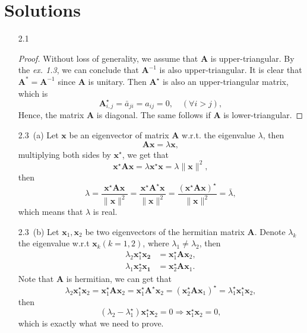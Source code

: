 \section{Solutions}
\begin{enumerate}
    \item [2.1] {
    \begin{proof}
        Without loss of generality, we assume that $\bm{A}$ is upper-triangular. By the \textit{ex. 1.3}, we can conclude that $\bm{A}^{-1}$ is also upper-triangular. It is clear that $\bm{A}^{*} = \bm{A}^{-1}$ since $\bm{A}$ is unitary. Then $\bm{A}^{\star}$ is also an upper-triangular matrix, which is
        $$
        \bm{A}^{\star}_{i,j} = \bar{a}_{ji} = a_{ij} = 0, \quad (\forall i > j),
        $$
        Hence, the matrix $\bm{A}$ is diagonal. The same follows if $\bm{A}$ is lower-triangular.
    \end{proof}
    }

	
    \item[2.3~(a)] {
    Let $\bm{x}$ be an eigenvector of matrix $\bm{A}$ w.r.t. the eigenvalue $\lambda$, then
    \[\bm{A}\bm{x} = \lambda \bm{x},\]
    multiplying both sides by $\bm{x}^{\star}$, we get that
    \begin{equation*}
    \bm{x}^{\star} \bm{A} \bm{x} = \lambda \bm{x}^{\star}\bm{x} = \lambda \| \bm{x} \|^{2}, \tag{$\spadesuit$}
    \end{equation*}
    then 
    $$
    \lambda = \frac{\bm{x}^{\star} \bm{A} \bm{x} }{ \| \bm{x} \|^{2}} = \frac{\bm{x}^{\star} \bm{A}^{\star} \bm{x} }{ \| \bm{x} \|^{2}} = \frac{(\bm{x}^{\star} \bm{A} \bm{x} )^{\star}}{ \| \bm{x} \|^{2}} = \bar{\lambda},
    $$
    which means that $\lambda$ is real. }
    
    \item[2.3~(b)] {
    Let $\bm{x}_1, \bm{x}_2$ be  two eigenvectors of the hermitian matrix $\bm{A}$. Denote $\lambda_k $ the eigenvalue w.r.t $\bm{x}_k (k=1,2)$, where $\lambda_1 \neq \lambda_2 $, then
    $$
    \begin{aligned}
    \lambda_2 \bm{x}_1^\star \bm{x_2} &= \bm{x}_1^{\star} \bm{A} \bm{x}_{2}, \\
    \lambda_1 \bm{x}_2^\star \bm{x_1} &= \bm{x}_2^{\star} \bm{A} \bm{x}_{1}.
    \end{aligned}
    $$
    Note that $\bm{A}$ is hermitian, we can get that
    $$
    \lambda_2 \bm{x}_1^{\star} \bm{x}_2 = \bm{x}_1^{\star} \bm{A} \bm{x}_2 = \bm{x}_1^{\star} \bm{A}^{\star} \bm{x}_2 =  (\bm{x}_2^{\star} \bm{A} \bm{x}_1)^{\star} = \lambda_1^{\star} \bm{x}_1^{\star} \bm{x}_2,
    $$
    then
    $$
    (\lambda_2 - \lambda_1^{\star}) \bm{x}_1^{\star} \bm{x}_2 = 0 \Rightarrow \bm{x}_1^{\star} \bm{x}_2 = 0,
    $$
    which is exactly what we need to prove.
    }
    

\end{enumerate}
